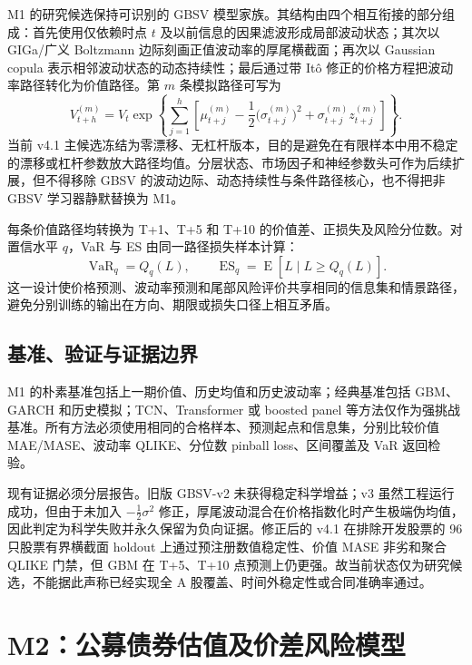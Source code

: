 M1 的研究候选保持可识别的 GBSV 模型家族。其结构由四个相互衔接的部分组成：首先使用仅依赖时点 \(t\) 及以前信息的因果滤波形成局部波动状态；其次以 GIGa/广义 Boltzmann 边际刻画正值波动率的厚尾横截面；再次以 Gaussian copula 表示相邻波动状态的动态持续性；最后通过带 Itô 修正的价格方程把波动率路径转化为价值路径。第 \(m\) 条模拟路径可写为
\begin{equation}
  V_{t+h}^{(m)}=V_t\exp\!\left\{
  \sum_{j=1}^{h}\left[
  \mu_{t+j}^{(m)}-\frac{1}{2}\bigl(\sigma_{t+j}^{(m)}\bigr)^2
  +\sigma_{t+j}^{(m)}z_{t+j}^{(m)}
  \right]\right\}.
\end{equation}
当前 v4.1 主候选冻结为零漂移、无杠杆版本，目的是避免在有限样本中用不稳定的漂移或杠杆参数放大路径均值。分层状态、市场因子和神经参数头可作为后续扩展，但不得移除 GBSV 的波动边际、动态持续性与条件路径核心，也不得把非 GBSV 学习器静默替换为 M1。

每条价值路径均转换为 T+1、T+5 和 T+10 的价值差、正损失及风险分位数。对置信水平 \(q\)，VaR 与 ES 由同一路径损失样本计算：
\begin{equation}
  \operatorname{VaR}_{q}=Q_q(L),\qquad
  \operatorname{ES}_{q}=\operatorname{E}\!\left[L\mid L\geq Q_q(L)\right].
\end{equation}
这一设计使价格预测、波动率预测和尾部风险评价共享相同的信息集和情景路径，避免分别训练的输出在方向、期限或损失口径上相互矛盾。

\subsection{基准、验证与证据边界}

M1 的朴素基准包括上一期价值、历史均值和历史波动率；经典基准包括 GBM、GARCH 和历史模拟\cite{engle_1982}；TCN、Transformer 或 boosted panel 等方法仅作为强挑战基准。所有方法必须使用相同的合格样本、预测起点和信息集，分别比较价值 MAE/MASE、波动率 QLIKE、分位数 pinball loss、区间覆盖及 VaR 返回检验。

现有证据必须分层报告。旧版 GBSV-v2 未获得稳定科学增益；v3 虽然工程运行成功，但由于未加入 \(-\frac{1}{2}\sigma^2\) 修正，厚尾波动混合在价格指数化时产生极端伪均值，因此判定为科学失败并永久保留为负向证据。修正后的 v4.1 在排除开发股票的 96 只股票有界横截面 holdout 上通过预注册数值稳定性、价值 MASE 非劣和聚合 QLIKE 门禁，但 GBM 在 T+5、T+10 点预测上仍更强。故当前状态仅为研究候选，不能据此声称已经实现全 A 股覆盖、时间外稳定性或合同准确率通过。

\section{M2：公募债券估值及价差风险模型}
\label{sec:m2-bond}

